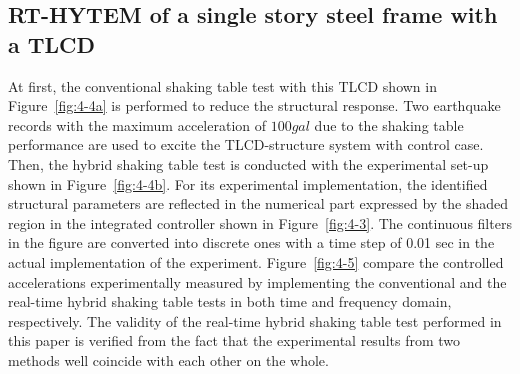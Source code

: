 







\subsection{RT-HYTEM of a single story steel frame with a TLCD}
At first, the conventional shaking table test with this TLCD shown in Figure~\ref{fig:4-4a} is performed to reduce the structural response. Two earthquake records with the maximum acceleration of $100gal$ due to the shaking table performance are used to excite the TLCD-structure system with control case. Then, the hybrid shaking table test is conducted with the experimental set-up shown in Figure~\ref{fig:4-4b}. For its experimental implementation, the identified structural parameters are reflected in the numerical part expressed by the shaded region in the integrated controller shown in Figure~\ref{fig:4-3}. The continuous filters in the figure are converted into discrete ones with a time step of 0.01 sec in the actual implementation of the experiment. Figure~\ref{fig:4-5} compare the controlled accelerations experimentally measured by implementing the conventional and the real-time hybrid shaking table tests in both time and frequency domain, respectively. The validity of the real-time hybrid shaking table test performed in this paper is verified from the fact that the experimental results from two methods well coincide with each other on the whole.

